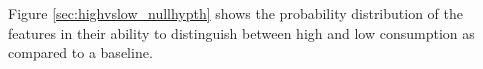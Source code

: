 Figure \ref{sec:highvslow_nullhypth} shows the probability distribution of the features in their ability to distinguish between high and low consumption as compared to a baseline.